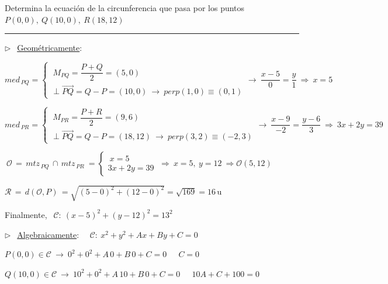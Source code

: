 \begin{miejercicio}

Determina la ecuación de la circunferencia que pasa por los puntos $P(0,0),\ Q(10,0),\ R(18,12)$

\rule{250pt}{0.1pt}

\vspace{2mm} $\triangleright \ \ $ \underline{Geométricamente}:

\begin{small}
\vspace{2mm} $med_{\, PQ}=\begin{cases} \ M_{PQ}=\dfrac{P+Q}{2}=(5,0) \\ \perp \overrightarrow{PQ}=Q-P=(10,0)\ \to \ perp (1,0) \equiv (0,1) \end{cases} \to \ \dfrac{x-5}{0}=\dfrac{y}{1} \ \Rightarrow \ x=5$

\vspace{2mm} $med_{\, PR}=\begin{cases} \ M_{PR}=\dfrac{P+R}{2}=(9,6) \\ \perp \overrightarrow{PQ}=Q-P=(18,12)\ \to \ perp (3,2) \equiv (-2,3) \end{cases} \to \ \dfrac{x-9}{-2}=\dfrac{y-6}{3} \ \Rightarrow \ 3x+2y=39$
\end{small}

\vspace{2mm} $\ \mathcal O\,= \, mtz_{\, PQ} \, \cap \, mtz_{\, PR} \ = \begin{cases} \ x=5 \\ 3x+2y=39 \end{cases} \ \Rightarrow \ x=5,\ y=12 \ \Rightarrow \mathcal O(5,12)$

\vspace{2mm} $\mathcal R \, = \, d(\mathcal O, P) \, = \sqrt{(5-0 )^2+(12-0)^2}=\sqrt{169}=16\, \mathrm{u}$

\vspace{2mm} Finalmente, $\ \ \mathcal C:\ (x-5)^2+(y-12)^2=13^2$


\vspace{5mm} $\triangleright \ \ $ \underline{Algebraicamente}: $\quad \mathcal C:\ x^2+y^2+Ax+By+C=0$

\vspace{2mm} $P(0,0)\in \mathcal C \ \to \ 0^2+0^2+A\, 0+B\, 0+ C=0 \ \quad \ C=0$ 

\vspace{2mm} $Q(10,0)\in \mathcal C \ \to \ 10^2+0^2+A\, 10+B\, 0 + C=0 \ \quad \ 10A+C+100=0$


\end{miejercicio}
